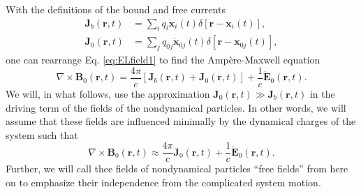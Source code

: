 With the definitions of the bound and free currents
\begin{equation}
\begin{split}
\mathbf{J}_b(\mathbf{r},t) &= \sum_iq_i\dot{\mathbf{x}}_i(t)\delta[\mathbf{r} - \mathbf{x}_i(t)],\\
\mathbf{J}_0(\mathbf{r},t) &= \sum_jq_{0j}\dot{\mathbf{x}}_{0j}(t)\delta[\mathbf{r} - \mathbf{x}_{0j}(t)],
\end{split}
\end{equation}
one can rearrange Eq. \eqref{eq:ELfield1} to find the Amp\`{e}re-Maxwell equation
\begin{equation}
\nabla\times\mathbf{B}_0(\mathbf{r},t) = \frac{4\pi}{c}\left[\mathbf{J}_b(\mathbf{r},t) + \mathbf{J}_0(\mathbf{r},t)\right] + \frac{1}{c}\dot{\mathbf{E}}_0(\mathbf{r},t).
\end{equation}
We will, in what follows, use the approximation $\mathbf{J}_0(\mathbf{r},t)\gg\mathbf{J}_b(\mathbf{r},t)$ in the driving term of the fields of the nondynamical particles. In other words, we will assume that these fields are influenced minimally by the dynamical charges of the system such that
\begin{equation}
\nabla\times\mathbf{B}_0(\mathbf{r},t) \approx \frac{4\pi}{c}\mathbf{J}_0(\mathbf{r},t) + \frac{1}{c}\dot{\mathbf{E}}_0(\mathbf{r},t).
\end{equation}
Further, we will call thee fields of nondynamical particles ``free fields'' from here on to emphasize their independence from the complicated system motion.

